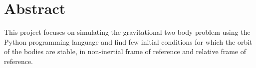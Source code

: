 \newpage
\section{Abstract}

This project focuses on simulating the gravitational two body problem using the Python programming language and find few initial conditions for which the orbit of the bodies are stable, in non-inertial frame of reference and relative frame of reference.
